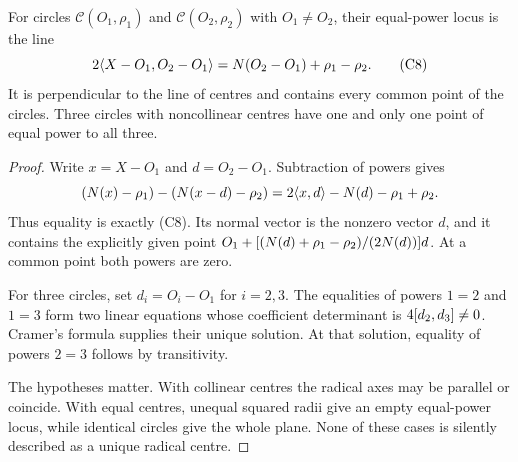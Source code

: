 \begin{theorem}
\label{circ:radical}
For circles $\mathcal C(O_1,\rho_1)$ and
$\mathcal C(O_2,\rho_2)$ with $O_1\ne O_2$, their equal-power locus is
the line
\[
 2\langle X-O_1,O_2-O_1\rangle
       =N(O_2-O_1)+\rho_1-\rho_2.              \tag{C8}
\]
It is perpendicular to the line of centres and contains every common
point of the circles.  Three circles with noncollinear centres have one
and only one point of equal power to all three.
\end{theorem}
\begin{proof}
Write $x=X-O_1$ and $d=O_2-O_1$.  Subtraction of powers gives
\[
 (N(x)-\rho_1)-(N(x-d)-\rho_2)
       =2\langle x,d\rangle-N(d)-\rho_1+\rho_2.
\]
Thus equality is exactly (C8).  Its normal vector is the nonzero vector
$d$, and it contains the explicitly given point
$O_1+[(N(d)+\rho_1-\rho_2)/(2N(d))]d$.
At a common point both powers are zero.

For three circles, set $d_i=O_i-O_1$ for $i=2,3$.
The equalities of powers $1=2$ and $1=3$ form two linear equations whose
coefficient determinant is $4[d_2,d_3]\ne0$.
Cramer's formula supplies their unique solution.  At that solution,
equality of powers $2=3$ follows by transitivity.

The hypotheses matter.  With collinear centres the radical axes may be
parallel or coincide.  With equal centres, unequal squared radii give an
empty equal-power locus, while identical circles give the whole plane.
None of these cases is silently described as a unique radical centre.
\end{proof}


